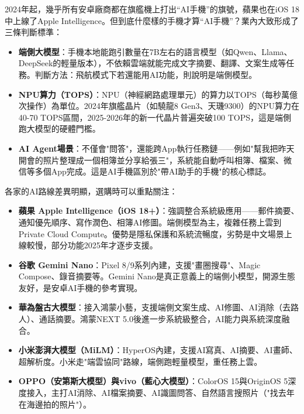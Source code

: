 


2024年起，幾乎所有安卓廠商都在旗艦機上打出“AI手機”的旗號，蘋果也在iOS 18中上線了Apple Intelligence。但到底什麼樣的手機才算“AI手機”？業內大致形成了三條判斷標準：

\begin{itemize}
  \item \textbf{端側大模型}：手機本地能跑引數量在7B左右的語言模型（如Qwen、Llama、DeepSeek的輕量版本），不依賴雲端就能完成文字摘要、翻譯、文案生成等任務。判斷方法：飛航模式下若還能用AI功能，則說明是端側模型。
  \item \textbf{NPU算力（TOPS）}：NPU（神經網路處理單元）的算力以TOPS（每秒萬億次操作）為單位。2024年旗艦晶片（如驍龍8 Gen3、天璣9300）的NPU算力在40-70 TOPS區間，2025-2026年的新一代晶片普遍突破100 TOPS，這是端側跑大模型的硬體門檻。
  \item \textbf{AI Agent場景}：不僅會"問答"，還能跨App執行任務鏈——例如"幫我把昨天開會的照片整理成一個相簿並分享給張三"，系統能自動呼叫相簿、檔案、微信等多個App完成。這是AI手機區別於"帶AI助手的手機"的核心標誌。
\end{itemize}


各家的AI路線差異明顯，選購時可以重點關注：

\begin{itemize}
  \item \textbf{蘋果 Apple Intelligence（iOS 18+）}：強調整合系統級應用——郵件摘要、通知優先順序、寫作潤色、相簿AI修圖。端側模型為主，複雜任務上雲到Private Cloud Compute。優勢是隱私保護和系統流暢度，劣勢是中文場景上線較慢，部分功能2025年才逐步支援。
  \item \textbf{谷歌 Gemini Nano}：Pixel 8/9系列內建，支援"畫圈搜尋"、Magic Compose、錄音摘要等。Gemini Nano是真正意義上的端側小模型，開源生態友好，是安卓AI手機的參考實現。
  \item \textbf{華為盤古大模型}：接入鴻蒙小藝，支援端側文案生成、AI修圖、AI消除（去路人）、通話摘要。鴻蒙NEXT 5.0後進一步系統級整合，AI能力與系統深度融合。
  \item \textbf{小米澎湃大模型（MiLM）}：HyperOS內建，支援AI寫真、AI摘要、AI畫師、超解析度。小米走"端雲協同"路線，端側跑輕量模型，重任務上雲。
  \item \textbf{OPPO（安第斯大模型）與vivo（藍心大模型）}：ColorOS 15與OriginOS 5深度接入，主打AI消除、AI檔案摘要、AI識圖問答、自然語言搜照片（"找去年在海邊拍的照片"）。
\end{itemize}

